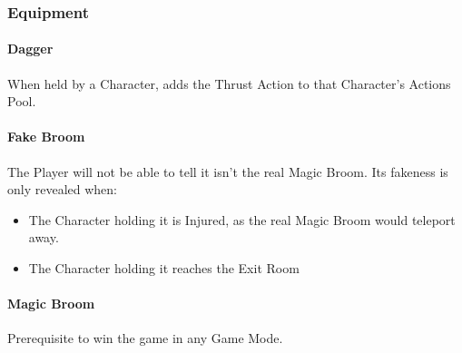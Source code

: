 \subsubsection{Equipment}


\paragraph{Dagger} When held by a Character, adds the Thrust Action to that Character's Actions Pool.

\paragraph{Fake Broom} The Player will not be able to tell it isn't the real Magic Broom. Its fakeness is only revealed when:

\begin{itemize}
	\item The Character holding it is Injured, as the real Magic Broom would teleport away.
	\item The Character holding it reaches the Exit Room
\end{itemize}

\paragraph{Magic Broom} Prerequisite to win the game in any Game Mode.